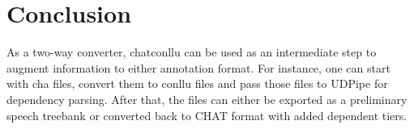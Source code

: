 \chapter{Conclusion} %

\label{Chapter6} %

As a two-way converter, chatconllu can be used as an intermediate step to augment information to either annotation format. For instance, one can start with cha files, convert them to conllu files and pass those files to UDPipe for dependency parsing. After that, the files can either be exported as a preliminary speech treebank or converted back to CHAT format with added dependent tiers.



